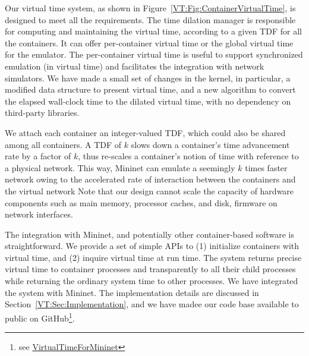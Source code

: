 \begin{figure*}
    \centering
    \caption[Virtual Time System Design]{Architecture of the Virtual Time System in a Container-based Network Emulator.
    Note that a typical container-based network emulator can be presented by this figure without the Virtual Time Middleware.}
    \label{VT:Fig:ContainerVirtualTime}
\end{figure*}

Our virtual time system, as shown in Figure~\ref{VT:Fig:ContainerVirtualTime}, is designed to meet all the requirements. 
The time dilation manager is responsible for computing and maintaining the virtual time, according to a given TDF for all the containers. 
It can offer per-container virtual time or the global virtual time for the emulator.
The per-container virtual time is useful to support synchronized emulation (in virtual time) and facilitates the integration with network simulators. 
We have made a small set of changes in the kernel, in particular, a modified data structure to present virtual time,
and a new algorithm to convert the elapsed wall-clock time to the dilated virtual time, with no dependency on third-party libraries.

We attach each container an integer-valued TDF, which could also be shared among all containers. 
A TDF of $k$ slows down a container's time advancement rate by a factor of $k$, thus re-scales a container's notion of time with reference to a physical network. 
This way, Mininet can emulate a seemingly $k$ times faster network owing to the accelerated rate of interaction between the containers and the virtual network
Note that our design cannot scale the capacity of hardware components such as main memory, processor caches, and disk, firmware on network interfaces. 

The integration with Mininet, and potentially other container-based software is straightforward. 
We provide a set of simple APIs to (1) initialize containers with virtual time, and (2) inquire virtual time at run time. 
The system returns precise virtual time to container processes and transparently to all their child processes while returning the ordinary system time to other processes. 
We have integrated the system with Mininet. The implementation details are discussed in Section~\ref{VT:Sec:Implementation}, and we have madee our code base available to public on GitHub\footnote{see \href{https://github.com/littlepretty/VirtualTimeForMininet}{VirtualTimeForMininet}}. 

